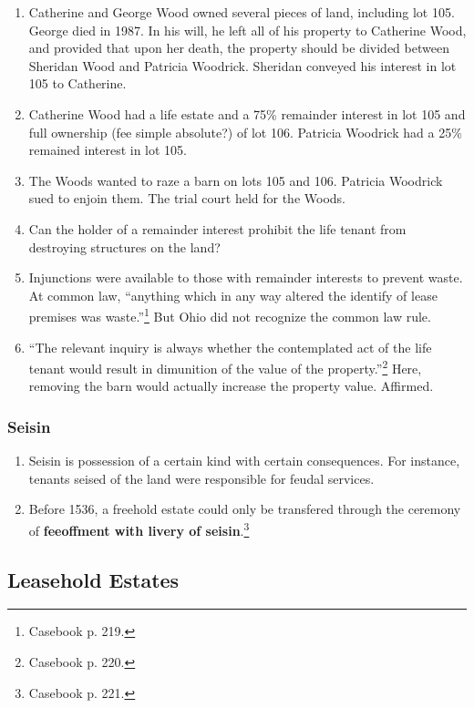 \begin{enumerate}
    \item Catherine and George Wood owned several pieces of land, including 
    lot 105. George died in 1987. In his will, he left all of his property to 
    Catherine Wood, and provided that upon her death, the property should be 
    divided between Sheridan Wood and Patricia Woodrick. Sheridan conveyed his 
    interest in lot 105 to Catherine.
    \item Catherine Wood had a life estate and a 75\% remainder interest in 
    lot 105 and full ownership (fee simple absolute?) of lot 106. Patricia 
    Woodrick had a 25\% remained interest in lot 105.
    \item The Woods wanted to raze a barn on lots 105 and 106. Patricia 
    Woodrick sued to enjoin them. The trial court held for the Woods.
    \item Can the holder of a remainder interest prohibit the life tenant from 
    destroying structures on the land?
    \item Injunctions were available to those with remainder 
    interests to prevent waste. At common law, ``anything which in any way 
    altered the identify of lease premises was waste.''\footnote{Casebook p. 
    219.} But Ohio did not recognize the common law rule.
    \item ``The relevant inquiry is always whether the contemplated act of the 
    life tenant would result in dimunition of the value of the 
    property.''\footnote{Casebook p. 220.} Here, removing the barn would 
    actually increase the property value. Affirmed.
\end{enumerate}

\subsubsection{Seisin}

\begin{enumerate}
    \item Seisin is possession of a certain kind with certain consequences. 
    For instance, tenants seised of the land were responsible for feudal 
    services.
    \item Before 1536, a freehold estate could only be transfered through the 
    ceremony of \textbf{feeoffment with livery of seisin}.\footnote{Casebook 
    p. 221.}
\end{enumerate}

\subsection{Leasehold Estates}

